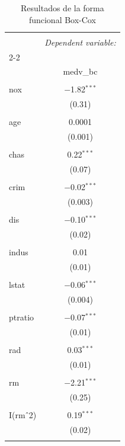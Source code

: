 
\begin{table}[!htbp] \centering 
  \caption{Resultados de la forma funcional Box-Cox} 
  \label{} 
\begin{tabular}{@{\extracolsep{5pt}}lc} 
\\[-1.8ex]\hline 
\hline \\[-1.8ex] 
 & \multicolumn{1}{c}{\textit{Dependent variable:}} \\ 
\cline{2-2} 
\\[-1.8ex] & medv\_bc \\ 
\hline \\[-1.8ex] 
 nox & $-$1.82$^{***}$ \\ 
  & (0.31) \\ 
  & \\ 
 age & 0.0001 \\ 
  & (0.001) \\ 
  & \\ 
 chas & 0.22$^{***}$ \\ 
  & (0.07) \\ 
  & \\ 
 crim & $-$0.02$^{***}$ \\ 
  & (0.003) \\ 
  & \\ 
 dis & $-$0.10$^{***}$ \\ 
  & (0.02) \\ 
  & \\ 
 indus & 0.01 \\ 
  & (0.01) \\ 
  & \\ 
 lstat & $-$0.06$^{***}$ \\ 
  & (0.004) \\ 
  & \\ 
 ptratio & $-$0.07$^{***}$ \\ 
  & (0.01) \\ 
  & \\ 
 rad & 0.03$^{***}$ \\ 
  & (0.01) \\ 
  & \\ 
 rm & $-$2.21$^{***}$ \\ 
  & (0.25) \\ 
  & \\ 
 I(rm$\hat{\mkern6mu}$2) & 0.19$^{***}$ \\ 
  & (0.02) \\ 
  & \\ 

\end{tabular}
\end{table}
